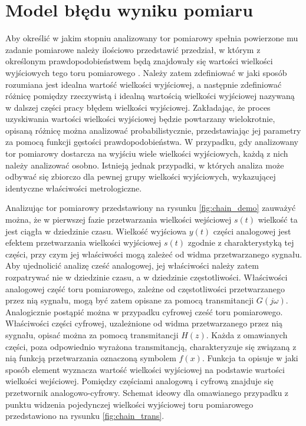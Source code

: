 \chapter{Model błędu wyniku pomiaru}

Aby określić w jakim stopniu analizowany tor pomiarowy spełnia powierzone mu zadanie pomiarowe należy ilościowo przedstawić przedział, w którym z określonym prawdopodobieństwem będą znajdowały się wartości wielkości wyjściowych tego toru pomiarowego \cite{jcgm_guide}. Należy zatem zdefiniować w jaki sposób rozumiana jest idealna wartość wielkości wyjściowej, a następnie zdefiniować różnicę pomiędzy rzeczywistą i idealną wartością wielkości wyjściowej nazywaną w dalszej części pracy błędem wielkości wyjściowej. Zakładając, że proces uzyskiwania wartości wielkości wyjściowej będzie powtarzany wielokrotnie, opisaną różnicę można analizować probabilistycznie, przedstawiając jej parametry za pomocą funkcji gęstości prawdopodobieństwa. W przypadku, gdy analizowany tor pomiarowy dostarcza na wyjściu wiele wielkości wyjściowych, każdą z nich należy analizować osobno. Istnieją jednak przypadki, w których analiza może odbywać się zbiorczo dla pewnej grupy wielkości wyjściowych, wykazującej identyczne właściwości metrologiczne.

Analizując tor pomiarowy przedstawiony na rysunku \ref{fig:chain_demo} zauważyć można, że w pierwszej fazie przetwarzania wielkości wejściowej $s(t)$ wielkość ta jest ciągła w dziedzinie czasu. Wielkość wyjściowa $y(t)$ części analogowej jest efektem przetwarzania wielkości wyjściowej $s(t)$ zgodnie z charakterystyką tej części, przy czym jej właściwości mogą zależeć od widma przetwarzanego sygnału. Aby ujednolicić analizę cześć analogowej, jej właściwości należy zatem rozpatrywać nie w dziedzinie czasu, a w dziedzinie częstotliwości. Właściwości analogowej część toru pomiarowego, zależne od częstotliwości przetwarzanego przez nią sygnału, mogą być zatem opisane za pomocą transmitancji $G(j\omega)$. Analogicznie postąpić można w przypadku cyfrowej cześć toru pomiarowego. Właściwości części cyfrowej, uzależnione od widma przetwarzanego przez nią sygnału, opisać można za pomocą transmitancji $H(z)$. Każda z omawianych części, poza odpowiednio wyrażona transmitancją, charakteryzuje się związaną z nią funkcją przetwarzania oznaczoną symbolem $f(x)$. Funkcja ta opisuje w jaki sposób element wyznacza wartość wielkości wyjściowej na podstawie wartości wielkości wejściowej. Pomiędzy częściami analogową i cyfrową znajduje się przetwornik analogowo-cyfrowy. Schemat ideowy dla omawianego przypadku z punktu widzenia pojedynczej wielkości wyjściowej toru pomiarowego przedstawiono na rysunku \ref{fig:chain_trans}.

